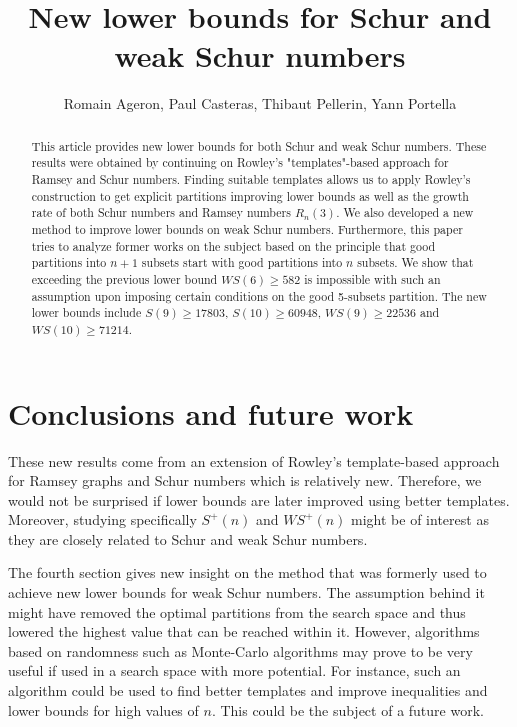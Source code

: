 \documentclass{article}
\title{New lower bounds for Schur and weak Schur numbers}
\author{Romain Ageron, Paul Casteras, Thibaut Pellerin, Yann Portella}
\newtheorem{computational theorem}{Computational Theorem}[section]
\begin{document}
\maketitle

\begin{abstract}

This article provides new lower bounds for both Schur and weak Schur numbers. These results were obtained by continuing on
Rowley's "templates"-based approach for Ramsey and Schur numbers. Finding suitable templates allows us to apply Rowley's construction
to get explicit partitions improving lower bounds as well as the growth rate of both Schur numbers and Ramsey numbers \(R_n(3)\). 
We also developed a new method to improve lower bounds on weak Schur numbers. Furthermore, this paper tries to analyze former 
works on the subject based on the principle that good partitions into \(n+1\) subsets start with good partitions 
into \(n\) subsets. We show that exceeding the previous lower bound \(WS(6) \geqslant 582\) is impossible with such an assumption upon 
imposing certain conditions on the good 5-subsets partition. The new lower bounds include \(S(9) \geqslant 17803\), \(S(10) \geqslant 60948\), 
\(WS(9) \geqslant 22536 \) and \(WS(10) \geqslant 71214 \).

\end{abstract}















\section{Conclusions and future work}

\par
These new results come from an extension of Rowley's template-based approach for Ramsey graphs and Schur numbers which is relatively new. 
Therefore, we would not be surprised if lower bounds are later improved using better templates. Moreover, studying specifically \(S^+(n)\) and 
\(WS^+(n)\) might be of interest as they are closely related to Schur and weak Schur numbers.

\par
The fourth section gives new insight on the method that was formerly used to achieve new lower bounds for weak Schur numbers. The assumption behind it
might have removed the optimal partitions from the search space and thus lowered the highest value that can be reached within it.
However, algorithms based on randomness such as Monte-Carlo algorithms may prove to be very useful if used in a search space with more
potential. For instance, such an algorithm could be used to find better templates and improve inequalities and lower bounds for high values
of \(n\). This could be the subject of a future work.
\end{document}
